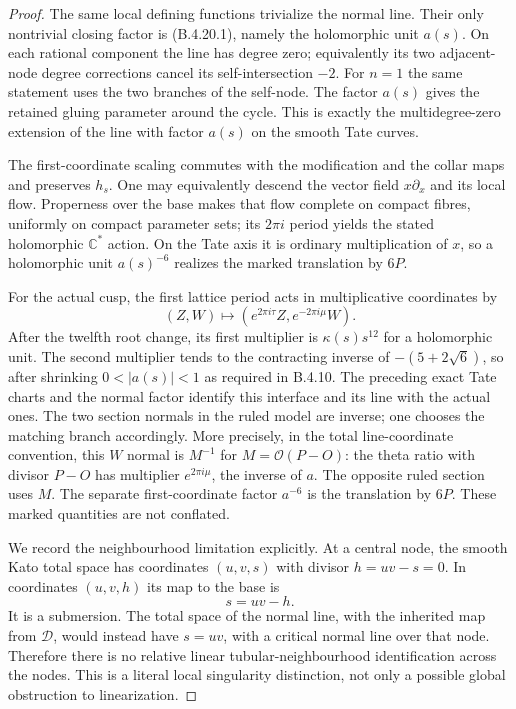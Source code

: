 \begin{proof}
The same local defining functions trivialize the
normal line. Their only nontrivial closing factor
is (B.4.20.1), namely the holomorphic unit $a(s)$.
On each rational component the line has degree
zero; equivalently its two adjacent-node degree
corrections cancel its self-intersection $-2$.
For $n=1$ the same statement uses the two branches
of the self-node. The factor $a(s)$ gives the
retained gluing parameter around the cycle.
This is exactly the multidegree-zero extension
of the line with factor $a(s)$ on the smooth
Tate curves.

The first-coordinate scaling commutes with the
modification and the collar maps and preserves
$h_s$. One may equivalently descend the vector
field $x\partial_x$ and its local flow. Properness
over the base makes that flow complete on compact
fibres, uniformly on compact parameter sets;
its $2\pi i$ period yields the stated holomorphic
$\mathbb C^*$ action. On the Tate axis it is
ordinary multiplication of $x$, so a holomorphic
unit $a(s)^{-6}$ realizes the marked translation
by $6P$.

For the actual cusp, the first lattice period
acts in multiplicative coordinates by
\[
 (Z,W)\longmapsto
       (e^{2\pi i\tau}Z,e^{-2\pi i\mu}W).
\]
After the twelfth root change, its first multiplier
is $\kappa(s)s^{12}$ for a holomorphic unit.
The second multiplier tends to the contracting
inverse of $-(5+2\sqrt6)$, so after shrinking
$0<|a(s)|<1$ as required in B.4.10.
The preceding exact Tate charts and the normal
factor identify this interface and its line with
the actual ones. The two section normals in the
ruled model are inverse; one chooses the matching
branch accordingly. More precisely, in the total
line-coordinate convention, this $W$ normal is
$M^{-1}$ for $M=\mathcal O(P-O)$: the theta ratio
with divisor $P-O$ has multiplier $e^{2\pi i\mu}$,
the inverse of $a$. The opposite ruled section
uses $M$. The separate first-coordinate factor
$a^{-6}$ is the translation by $6P$.
These marked quantities are not conflated.

We record the neighbourhood limitation explicitly.
At a central node, the smooth Kato total space
has coordinates $(u,v,s)$ with divisor
$h=uv-s=0$. In coordinates $(u,v,h)$ its map to
the base is
\[
 s=uv-h.
 \tag{B.4.20.2}
\]
It is a submersion. The total space of the normal
line, with the inherited map from $\mathcal D$,
would instead have $s=uv$, with a critical normal
line over that node. Therefore there is no
relative linear tubular-neighbourhood identification
across the nodes. This is a literal local
singularity distinction, not only a possible
global obstruction to linearization.


\end{proof}
